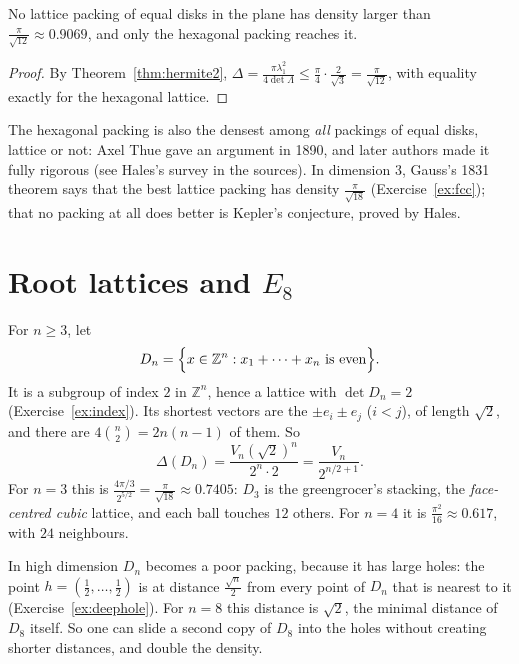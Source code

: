 \begin{corollary}\label{cor:hexdensity}
No lattice packing of equal disks in the plane has density larger than $\frac\pi{\sqrt{12}}\approx0.9069$, and only the hexagonal packing reaches it.
\end{corollary}

\begin{proof}
By Theorem~\ref{thm:hermite2}, $\Delta=\frac{\pi\lambda_1^2}{4\det\Lambda}\le\frac\pi4\cdot\frac2{\sqrt3}=\frac\pi{\sqrt{12}}$, with equality exactly for the hexagonal lattice.
\end{proof}

\begin{remark}
The hexagonal packing is also the densest among \emph{all} packings of equal disks, lattice or not: Axel Thue gave an argument in 1890, and later authors made
it fully rigorous (see Hales's survey in the sources). In dimension $3$, Gauss's 1831 theorem says that the best lattice packing has density
$\frac\pi{\sqrt{18}}$ (Exercise~\ref{ex:fcc}); that no packing at all does better is Kepler's conjecture, proved by Hales.
\end{remark}

\section{Root lattices and \texorpdfstring{$E_8$}{E8}}

For $n\ge3$, let
\[
D_n=\Bigl\{x\in\mathbb Z^n:x_1+\dots+x_n\ \text{is even}\Bigr\}.
\]
It is a subgroup of index $2$ in $\mathbb Z^n$, hence a lattice with $\det D_n=2$ (Exercise~\ref{ex:index}). Its shortest vectors are the $\pm e_i\pm e_j$ ($i<j$), of
length $\sqrt2$, and there are $4\binom n2=2n(n-1)$ of them. So
\[
\Delta(D_n)=\frac{V_n(\sqrt2)^n}{2^n\cdot2}=\frac{V_n}{2^{n/2+1}}.
\]
For $n=3$ this is $\frac{4\pi/3}{2^{5/2}}=\frac\pi{\sqrt{18}}\approx0.7405$: $D_3$ is the greengrocer's stacking, the \emph{face-centred cubic} lattice, and each
ball touches $12$ others. For $n=4$ it is $\frac{\pi^2}{16}\approx0.617$, with $24$ neighbours.

In high dimension $D_n$ becomes a poor packing, because it has large holes: the point $h=(\frac12,\dots,\frac12)$ is at distance $\frac{\sqrt n}2$ from every
point of $D_n$ that is nearest to it (Exercise~\ref{ex:deephole}). For $n=8$ this distance is $\sqrt2$, the minimal distance of $D_8$ itself. So one can
slide a second copy of $D_8$ into the holes without creating shorter distances, and double the density.

